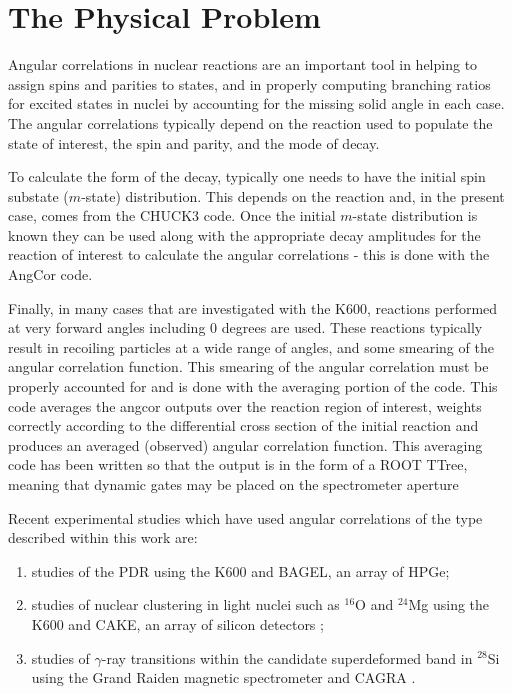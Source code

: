 \documentclass[a4paper,10pt]{article}
\begin{document}
\section{The Physical Problem}

Angular correlations in nuclear reactions are an important tool in helping to assign spins and parities to states, and in properly computing branching ratios for excited states in nuclei by accounting for the missing solid angle in each case. The angular correlations typically depend on the reaction used to populate the state of interest, the spin and parity, and the mode of decay.

To calculate the form of the decay, typically one needs to have the initial spin substate ($m$-state) distribution. This depends on the reaction and, in the present case, comes from the CHUCK3 code. Once the initial $m$-state distribution is known they can be used along with the appropriate decay amplitudes for the reaction of interest to calculate the angular correlations - this is done with the AngCor code.

Finally, in many cases that are investigated with the K600, reactions performed at very forward angles including 0 degrees are used. These reactions typically result in recoiling particles at a wide range of angles, and some smearing of the angular correlation function. This smearing of the angular correlation must be properly accounted for and is done with the averaging portion of the code. This code averages the angcor outputs over the reaction region of interest, weights correctly according to the differential cross section of the initial reaction and produces an averaged (observed) angular correlation function. This averaging code has been written so that the output is in the form of a ROOT TTree, meaning that dynamic gates may be placed on the spectrometer aperture 

Recent experimental studies which have used angular correlations of the type described within this work are:

\begin{enumerate}
 \item studies of the PDR using the K600 and BAGEL, an array of HPGe;
 \item studies of nuclear clustering in light nuclei such as $^{16}$O \cite{dummy} and $^{24}$Mg \cite{dummy} using the K600 and CAKE, an array of silicon detectors \cite{dummy};
 \item studies of $\gamma$-ray transitions within the candidate superdeformed band in $^{28}$Si using the Grand Raiden magnetic spectrometer and CAGRA \cite{dummy}.
\end{enumerate}
  
\end{document}
